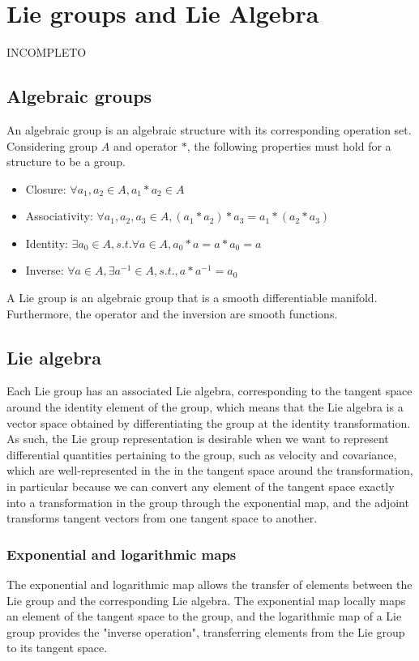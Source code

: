 \section{Lie groups and Lie Algebra}
\label{sec:sec2_lie}

INCOMPLETO

\subsection{Algebraic groups}
\label{sec:sec2_groups}

An algebraic group is an algebraic structure with its corresponding operation set. Considering group $A$ and operator $\ast$, the following properties must hold for a structure to be a group.

\begin{itemize}
    \item Closure: $\forall a_1,a_2 \in A, a_1 \ast a_2 \in A$ 
    \item Associativity: $\forall a_1,a_2,a_3 \in A, (a_1 \ast a_2) \ast a_3 = a_1 \ast (a_2 \ast a_3)$
    \item Identity: $\exists a_0 \in A, s.t. \forall a \in A, a_0 \ast a = a \ast a_0 = a$
    \item Inverse: $\forall a \in A, \exists a^{-1} \in A, s.t., a \ast a^{-1} = a_0$
\end{itemize}

A Lie group is an algebraic group that is a smooth differentiable manifold. Furthermore, the operator and the inversion are smooth functions.

\subsection{Lie algebra}
\label{sec:sec2_lie_algebra}

Each Lie group has an associated Lie algebra, corresponding to the tangent space around the identity element of the group, which means that the Lie algebra is a vector space obtained by differentiating the group at the identity transformation. As such, the Lie group representation is desirable when we want to represent differential quantities pertaining to the group, such as velocity and covariance, which are well-represented in the in the tangent space around the transformation, in particular because we can convert any element of the tangent space exactly into a transformation in
the group through the exponential map, and the adjoint transforms tangent vectors from one tangent space to another.

\subsubsection{Exponential and logarithmic maps}

The exponential and logarithmic map allows the transfer of elements between
the Lie group and the corresponding Lie algebra. The exponential map locally maps an element of the tangent space to the group, and  the logarithmic map of a Lie group provides the "inverse operation", transferring elements from the Lie group to its tangent space.